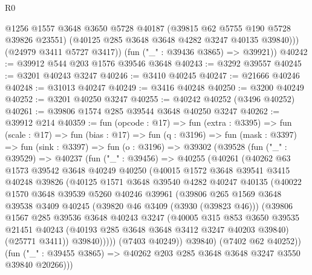\begin{lexlean}{R0}
\begin{coremodule}
            @1256
            @1557
            @3648
            @3650
            @5728
            @40187
            (@39815 @62 @5755 @190 @5728 @39826 @23551)
            (@40125 @285 @3648 @3648 @4282 @3247 @40135 @39840)))
        (@24979 @3411 @5727 @3417))
      (fun ("_" : @39436 @3865) => @39921))
@40242 := @39912 @544 @203 @1576 @39546 @3648
@40243 := @3292 @39557
@40245 := @3201 @40243 @3247
@40246 := @3410 @40245
@40247 := @21666 @40246
@40248 := @31013 @40247
@40249 := @3416 @40248
@40250 := @3200 @40249
@40252 := @3201 @40250 @3247
@40255 := @40242 @40252 (@3496 @40252)
@40261 := @39806 @1574 @285 @39544 @3648 @40250 @3247
@40262 := @39912 @214
@40359 := fun (opcode : @17) =>
  fun (extra : @3395) =>
  fun (scale : @17) =>
  fun (bias : @17) =>
  fun (q : @3196) =>
  fun (mask : @3397) =>
  fun (sink : @3397) =>
  fun (o : @3196) =>
  @39302
    (@39528
      (fun ("_" : @39529) =>
      @40237
        (fun ("_" : @39456) =>
        @40255
          (@40261
            (@40262
              @63
              @1573
              @39542
              @3648
              @40249
              @40250
              (@40015
                @1572
                @3648
                @39541
                @3415
                @40248
                @39826
                (@40125
                  @1571
                  @3648
                  @39540
                  @4282
                  @40247
                  @40135
                  (@40022
                    @1570
                    @3648
                    @39539
                    @5260
                    @40246
                    @39961
                    (@39806
                      @265
                      @1569
                      @3648
                      @39538
                      @3409
                      @40245
                      (@39820 @46 @3409 (@3930 (@39823 @46)))
                      (@39806
                        @1567
                        @285
                        @39536
                        @3648
                        @40243
                        @3247
                        (@40005
                          @315
                          @853
                          @3650
                          @39535
                          @21451
                          @40243
                          (@40193 @285 @3648 @3648 @3412 @3247 @40203 @39840)
                          (@25771 @3411))
                        @39840)))))
              (@7403 @40249))
            @39840)
          (@7402 @62 @40252))
        (fun ("_" : @39455 @3865) => @40262 @203 @285 @3648 @3648 @3247 @3550 @39840 @20266)))

\end{coremodule}
\end{lexlean}

